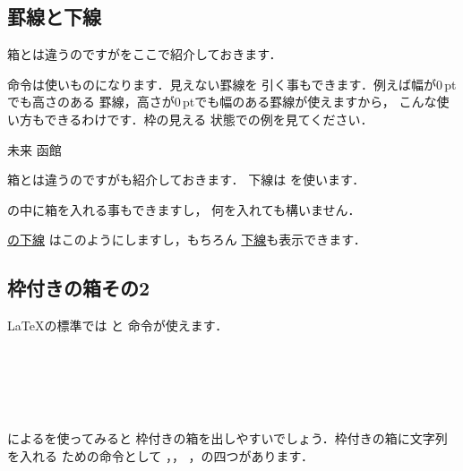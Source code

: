 \subsection{罫線と下線}

箱とは違うのですがをここで紹介しておきます．
\begin{Syntax}
\end{Syntax}
 命令は使いものになります．見えない罫線を
引く事もできます．例えば幅が0\,ptでも高さのある
罫線，高さが0\,ptでも幅のある罫線が使えますから，
こんな使い方もできるわけです．枠の見える
状態での例を見てください．
\begin{InOut}
\newcommand*\RULE[2]{%
  \rule{0pt}{#1}\rule{#2}{0pt}}
未来 \fbox{\RULE{3zw}{4zw}}
函館 \fbox{\RULE{3zw}{2zw}}
\end{InOut}

箱とは違うのですがも紹介しておきます．
下線は を使います．
\begin{Syntax}
\end{Syntax}
 の中に箱を入れる事もできますし，
何を入れても構いません．
\begin{InOut}
\underline{の下線}
はこのようにしますし，もちろん
\underline{下線}も表示できます．
\end{InOut}

\subsection{枠付きの箱その2\zdash{}}%
{\LaTeX}の標準では と 命令が使えます．
%
\begin{InOut}
 \\
\\
 \\
{\fboxrule=1pt}\\
{\fboxsep=0pt}
\end{InOut}

によるを使ってみると
枠付きの箱を出しやすいでしょう．枠付きの箱に文字列を入れる
ための命令として ，，
，の四つがあります．
\begin{InOut}
 \\
\end{InOut}

